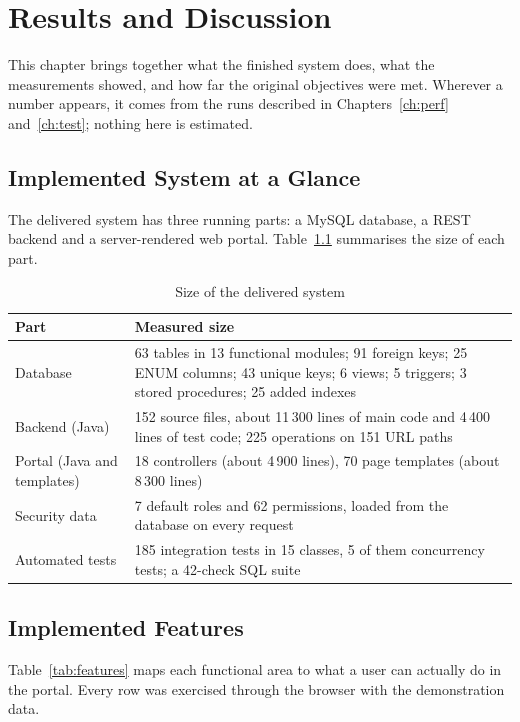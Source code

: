 \chapter{Results and Discussion}\label{ch:results}

This chapter brings together what the finished system does, what the measurements showed,
and how far the original objectives were met. Wherever a number appears, it comes from the
runs described in Chapters~\ref{ch:perf} and~\ref{ch:test}; nothing here is estimated.

\section{Implemented System at a Glance}
The delivered system has three running parts: a MySQL database, a REST backend and a
server-rendered web portal. Table~\ref{tab:delivered} summarises the size of each part.

\begin{table}[H]
\centering\small
\caption{Size of the delivered system}\label{tab:delivered}
\begin{tabularx}{\linewidth}{@{}p{5.4cm}X@{}}
\toprule \textbf{Part} & \textbf{Measured size}\\ \midrule
Database & 63 tables in 13 functional modules; 91 foreign keys; 25 ENUM columns; 43 unique keys; 6 views; 5 triggers; 3 stored procedures; 25 added indexes\\
Backend (Java) & 152 source files, about 11\,300 lines of main code and 4\,400 lines of test code; 225 operations on 151 URL paths\\
Portal (Java and templates) & 18 controllers (about 4\,900 lines), 70 page templates (about 8\,300 lines)\\
Security data & 7 default roles and 62 permissions, loaded from the database on every request\\
Automated tests & 185 integration tests in 15 classes, 5 of them concurrency tests; a 42-check SQL suite\\
\bottomrule
\end{tabularx}
\end{table}

\section{Implemented Features}
Table~\ref{tab:features} maps each functional area to what a user can actually do in the
portal. Every row was exercised through the browser with the demonstration data.

